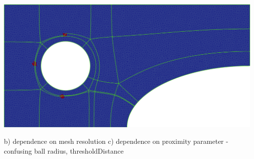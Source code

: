 \documentclass[a0paper,portrait, fontscale=0.30]{baposter}
\begin{document}
\begin{poster}
{%
\vspace{0.2cm}\noindent
\begin{center}
\begin{minipage}[!HT]{0.83\linewidth}
\vspace{-0.1cm}\noindent
\includegraphics[width=1.0\textwidth]{HIS4-sim-Rad002}
\label{fig:figure9}
\end{minipage}
\end{center}
\begin{minipage}[!HT]{1.0\linewidth}
\small b) dependence on mesh resolution
\newline
\small c) dependence on proximity parameter - confusing ball radius, thresholdDistance
\end{minipage}

}
\end{poster}
\end{document}
